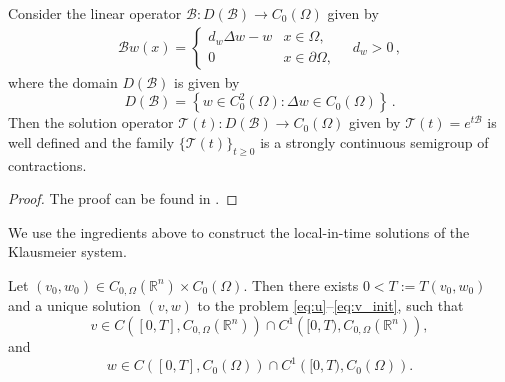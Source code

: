 \documentclass[review,onefignum,onetabnum]{SIAM-styles/siamart171218}
\begin{document}
\begin{lem}
    \label{lem:B_SEMIGROUP_GENERATOR}
    Consider the linear operator $\mathcal{B}: D(\mathcal{B}) \to C_0(\Omega)$ given by 
    \begin{align}
        \label{EQ:B_OPERATOR_DEFINITION}
        \mathcal{B} w (x) = 
        \begin{cases}
            d_w \Delta w - w &x \in \Omega, \\
            0 &x \in \partial \Omega, 
        \end{cases} \quad d_w > 0 \,, 
    \end{align}
    where the domain $D(\mathcal{B})$ is given by
    \begin{equation}
        \label{EQ:B_DOMAIN_DEFINITION}
        D(\mathcal{B}) = \left\{ w \in C^2_0(\Omega): \Delta w \in C_0(\Omega) \right\}\,.
    \end{equation}
    Then the solution operator $\mathcal{T}(t): D(\mathcal{B}) \to C_0(\Omega)$ given by $\mathcal{T}(t) = e^{t\mathcal{B}}$ is well defined and the family $\{\mathcal{T}(t)\}_{t \geq 0}$ is a strongly continuous semigroup of contractions.
\end{lem}
\begin{proof}
    The proof can be found in  \cite[Theorem 6.1.8]{Arendt2001}.
\end{proof}
We use the ingredients above to construct the local-in-time solutions of the Klausmeier system.
\begin{thm}
    \label{thm:Well-Posedness}
    Let $(v_0, w_0) \in C_{0, \Omega}(\mathbb{R}^n) \times C_0(\Omega)$. Then there exists $0 < T := T(v_0, w_0)$ and a unique solution $(v, w)$ to the problem \eqref{eq:u}--\eqref{eq:v_init}, such that
    \begin{equation}
        v \in C\left([0, T], C_{0, \Omega}(\mathbb{R}^n)\right) \cap C^1\left([0, T), C_{0, \Omega}(\mathbb{R}^n)\right),
    \end{equation}
    and
    \begin{equation}
        w \in C\left([0, T], C_0(\Omega)\right) \cap C^1\left([0, T), C_0(\Omega)\right).
    \end{equation}
\end{thm}
\end{document}
